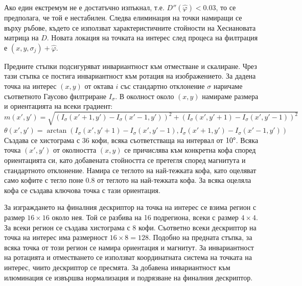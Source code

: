 \documentclass[a4paper,12pt]{article}
\begin{document}
\bigbreak

Ако един екстремум не е достатъчно изпъкнал, т.е. $D''(\hat{\varphi}) < 0.03$, то се предполага, че той е нестабилен. Следва елиминация на точки намиращи се върху ръбове, където се използват характеристичните стойности на Хесиановата матрица на $D$. Новата локация на точката на интерес след процеса на филтрация е $(x, y, \sigma_j) + \hat{\varphi}$.

\bigbreak

Предните стъпки подсигуряват инвариантност към отместване и скалиране. Чрез тази стъпка се постига инвариантност към ротация на изображението. За дадена точка на интерес $(x, y)$ от октава $i$ със стандартно отклонение $\sigma$ наричаме съответното Гаусово филтриране $I_{\sigma}$. В околност около $(x, y)$ намираме размера и ориентацията на всеки градиент: \\

$m(x', y') = \sqrt{(I_{\sigma}(x'+1,y') - I_{\sigma}(x'-1,y'))^2 + (I_{\sigma}(x', y'+1) - I_{\sigma}(x', y'-1))^2}$ \\
$\theta(x', y') = \arctan(I_{\sigma}(x',y'+1) - I_{\sigma}(x',y'-1), I_{\sigma}(x'+1,y') - I_{\sigma}(x'-1, y'))$ \\

Създава се хистограма с 36 кофи, всяка съответстваща на интервал от $10\degree$. Всяка точка $(x', y')$ от околността $(x, y)$ се причислява към конкретна кофа според ориентацията си, като добавената стойността се претегля според магнитута и стандартното отклонение. Намира се теглото на най-тежката кофа, като оцеляват само кофите с тегло поне $0.8$ от теглото на най-тежката кофа. За всяка оцеляла кофа се създава ключова точка с тази ориентация.

\bigbreak

За изграждането на финалния дескриптор на точка на интерес се взима регион с размер $16 \times 16$ около нея. Той се разбива на 16 подрегиона, всеки с размер $4 \times 4$. За всеки регион се създава хистограма с 8 кофи. Съответно всеки дескриптор на точка на интерес има размерност $16 \times 8 = 128$. Подобно на предната стъпка, за всяка точка от този регион се намира ориентация и магнитут. За инвариантност на ротацията и отместването се използват координатната система на точката на интерес, чиито дескриптор се пресмята. За добавена инвариантност към илюминация се извършва нормализация и подрязване на финалния дескриптор.

\end{document}

